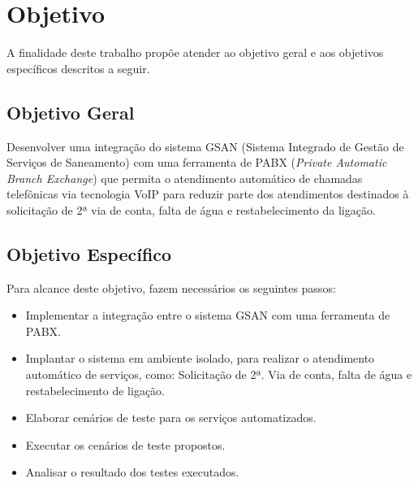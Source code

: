 \section*{Objetivo}

A finalidade deste trabalho propõe atender ao objetivo geral e aos objetivos específicos descritos a seguir.

\subsection*{Objetivo Geral}

Desenvolver uma integração do sistema GSAN (Sistema Integrado de Gestão de Serviços de Saneamento) com uma ferramenta de PABX (\textit{Private Automatic Branch Exchange}) que permita o atendimento automático de chamadas telefônicas via tecnologia VoIP para reduzir parte dos atendimentos destinados à solicitação de 2ª via de conta, falta de água e restabelecimento da ligação.

\subsection*{Objetivo Específico}
Para alcance deste objetivo, fazem necessários os seguintes passos:
\begin{itemize}
	\item Implementar a integração entre o sistema GSAN com uma ferramenta de PABX.
	\item Implantar o sistema em ambiente isolado, para realizar o atendimento automático de serviços, como: Solicitação de 2ª. Via de conta, falta de água e restabelecimento de ligação.
	\item Elaborar cenários de teste para os serviços automatizados. 
	\item Executar os cenários de teste propostos. 
	\item Analisar o resultado dos testes executados.
\end{itemize}